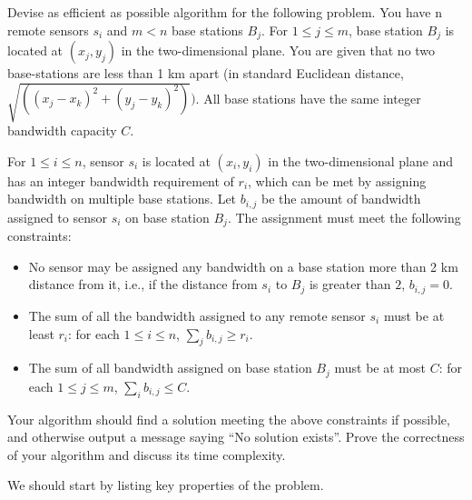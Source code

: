 \newpage
{} %

\problemdes

Devise as efficient as possible algorithm for the following problem. You have n remote sensors $s_i$ and $m < n$ base stations $B_j$. For $1 \le j \le m$, base station $B_j$ is located at $(x_j,y_j)$ in the two-dimensional plane. You are given that no two base-stations are less than 1 km apart (in standard Euclidean distance, $\sqrt{\left(\left(x_{j}-x_{k}\right)^{2}+\left(y_{j}-y_{k}\right)^{2}\right)})$. All base stations have the same integer bandwidth capacity $C$.

For $1 \le i \le n$, sensor $s_i$ is located at $(x_i, y_i)$ in the two-dimensional plane and has an integer bandwidth requirement of $r_i$, which can be met by assigning bandwidth on multiple base stations. Let $b_{i,j}$ be the amount of bandwidth assigned to sensor $s_i$ on base station $B_j$. The assignment must meet the following constraints:

\begin{itemize}
\item No sensor may be assigned any bandwidth on a base station more than 2 km distance from it, i.e., if the distance from $s_i$ to $B_j$ is greater than $2$, $b_{i,j} = 0$.
\item The sum of all the bandwidth assigned to any remote sensor $s_i$ must be at least $r_i$: for each $1 \leq i \leq n$, $\sum_{j} b_{i, j} \geq r_{i}$.
\item The sum of all bandwidth assigned on base station $B_j$ must be at most $C$: for each $1 \leq j \leq m$, $\sum_{i} b_{i, j} \leq C$.
\end{itemize}

Your algorithm should find a solution meeting the above constraints if possible, and otherwise output a message saying “No solution exists”. Prove the correctness of your algorithm and discuss its time complexity.

\solution


We should start by listing key properties of the problem.

